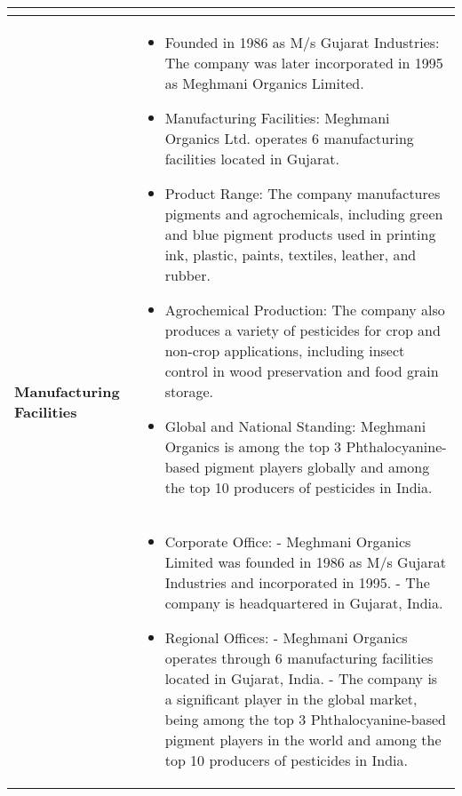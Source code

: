\documentclass{article}
\begin{document}
\begin{longtable}{|m{3cm}|p{14cm}|}
\begin{itemize}
    \end{itemize} \\
    \hline
    \multirow{8}{*}{\parbox{3cm}{\centering \textbf{Manufacturing Facilities}}} &
    \begin{itemize}
    \renewcommand\labelitemi{--}
        
        \item Founded in 1986 as M/s Gujarat Industries: The company was later incorporated in 1995 as Meghmani Organics Limited.
        
        \item Manufacturing Facilities: Meghmani Organics Ltd. operates 6 manufacturing facilities located in Gujarat.
        
        \item Product Range: The company manufactures pigments and agrochemicals, including green and blue pigment products used in printing ink, plastic, paints, textiles, leather, and rubber.
        
        \item Agrochemical Production: The company also produces a variety of pesticides for crop and non-crop applications, including insect control in wood preservation and food grain storage.
        
        \item Global and National Standing: Meghmani Organics is among the top 3 Phthalocyanine-based pigment players globally and among the top 10 producers of pesticides in India.
        
    \end{itemize} \\
    \hline
    \multirow{2}{*}{\parbox{3cm}{\centering \textbf{Corporate Offices}}} &
    \begin{itemize}
    \renewcommand\labelitemi{--}
        
        \item Corporate Office:   - Meghmani Organics Limited was founded in 1986 as M/s Gujarat Industries and incorporated in 1995.   - The company is headquartered in Gujarat, India. 
        
        \item Regional Offices:   - Meghmani Organics operates through 6 manufacturing facilities located in Gujarat, India.   - The company is a significant player in the global market, being among the top 3 Phthalocyanine-based pigment players in the world and among the top 10 producers of pesticides in India.
        

\end{itemize}
\end{longtable}
\end{document}
